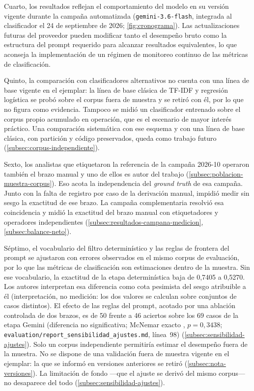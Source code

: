 Cuarto, los resultados reflejan el comportamiento del modelo en su versión vigente durante la campaña automatizada (\texttt{gemini-3.6-flash}, integrada al clasificador el 24 de septiembre de 2026; \autoref{fig:cronograma}). Las actualizaciones futuras del proveedor pueden modificar tanto el desempeño bruto como la estructura del prompt requerido para alcanzar resultados equivalentes, lo que aconseja la implementación de un régimen de monitoreo continuo de las métricas de clasificación.

Quinto, la comparación con clasificadores alternativos no cuenta con una línea de base vigente en el ejemplar: la línea de base clásica de TF-IDF y regresión logística se probó sobre el corpus fuera de muestra y se retiró con él, por lo que no figura como evidencia. Tampoco se midió un clasificador entrenado sobre el corpus propio acumulado en operación, que es el escenario de mayor interés práctico. Una comparación sistemática con ese esquema y con una línea de base clásica, con partición y código preservados, queda como trabajo futuro (\autoref{subsec:corpus-independiente}).

Sexto, los analistas que etiquetaron la referencia de la campaña 2026-10 operaron también el brazo manual y uno de ellos es autor del trabajo (\autoref{subsec:poblacion-muestra-corpus}). Eso acota la independencia del \emph{ground truth} de esa campaña. Junto con la falta de registro por caso de la derivación manual, impidió medir sin sesgo la exactitud de ese brazo. La campaña complementaria resolvió esa coincidencia y midió la exactitud del brazo manual con etiquetadores y operadores independientes (\autoref{subsec:resultados-campana-medicion}, \autoref{subsec:balance-neto}).

Séptimo, el vocabulario del filtro determinístico y las reglas de frontera del prompt se ajustaron con errores observados en el mismo corpus de evaluación, por lo que las métricas de clasificación son estimaciones dentro de la muestra. Sin ese vocabulario, la exactitud de la etapa determinística baja de 0,7405 a 0,5270. Los autores interpretan esa diferencia como cota pesimista del sesgo atribuible a él (interpretación, no medición: los dos valores se calculan sobre conjuntos de casos distintos). El efecto de las reglas del prompt, acotado por una ablación controlada de dos brazos, es de 50 frente a 46 aciertos sobre los 69 casos de la etapa Gemini (diferencia no significativa; McNemar exacto \parencite{McNemar1947_sampling_error}, \(p = 0{,}3438\); \texttt{evaluation/report\_sensibilidad\_ajustes.md}, línea~98) (\autoref{subsec:sensibilidad-ajustes}). Solo un corpus independiente permitiría estimar el desempeño fuera de la muestra. No se dispone de una validación fuera de muestra vigente en el ejemplar: la que se informó en versiones anteriores se retiró (\autoref{subsec:nota-versiones}). La limitación de fondo ---que el ajuste se derivó del mismo corpus--- no desaparece del todo (\autoref{subsec:sensibilidad-ajustes}).

